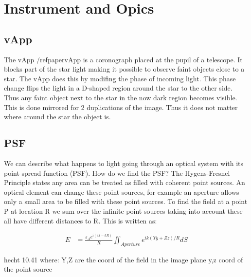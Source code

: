 
\chapter{Instrument and Opics} %

\label{ch:vapp} %

\section{vApp}

The vApp /ref{papervApp} is a coronograph placed at the pupil of a telescope. It blocks part of the star light making it possible to observe faint objects close to a star. The vApp does this by modifing the phase of incoming light. This phase change flips the light in a D-shaped region around the star to the other side. Thus any faint object next to the star in the now dark region becomes visible. This is done mirrored for 2 duplications of the image. Thus it does not matter where around the star the object is.


\section{PSF}

We can describe what happens to light going through an optical system with its point spread function (PSF). How do we find the PSF? The Hygens-Fresnel Principle states any area can be treated as filled with coherent point sources. An optical element can change these point sources, for example an aperture allows only a small area to be filled with these point sources. To find the field at a point P at location R we sum over the infinite point sources taking into account these all have different distances to R. This is written as:

\begin{subequations}
    \begin{align}
        E &= \frac{\varepsilon_A e^{i(wt-kR)}}{R} \iint_{Aperture} e^{ik(Yy+Zz)/R} dS
    \end{align}
\end{subequations}

hecht 10.41
where: Y,Z are the coord of the field in the image plane
y,z coord of the point source

